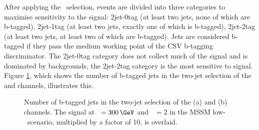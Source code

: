 After applying the \mT~selection, events are divided into three categories to maximise
sensitivity to the signal: 2jet-0tag (at least two jets, none of which are b-tagged), 2jet-1tag 
(at least two jets, exactly one of which is b-tagged), 2jet-2tag (at least two jets, at least two of which are b-tagged).
Jets are considered b-tagged if they pass the medium working point of the \ac{CSV} b-tagging discriminator.
The 2jet-0tag category does not collect much of the signal and is dominated by 
backgrounds, the 2jet-2tag category is the most sensitive to signal. 
Figure \ref{fig:Hhh_selection_bjets}, which shows the number of b-tagged jets in the two-jet selection of the \mutau and \etau
channels, illustrates this.

\begin{figure}[h!]
\begin{center}
\end{center}
\caption[Number of b-tagged jets in the two-jet selection of the \mutau and \etau channels.]{Number of b-tagged jets in the two-jet selection of the (a) \mutau and (b) \etau channels. The signal
at \mH~$=300\,\GeV$ and \tanb~$=2$ in the \ac{MSSM} low-\tanb~scenario, multiplied by a factor of 10, is overlaid.}
\label{fig:Hhh_selection_bjets}
\end{figure} 

